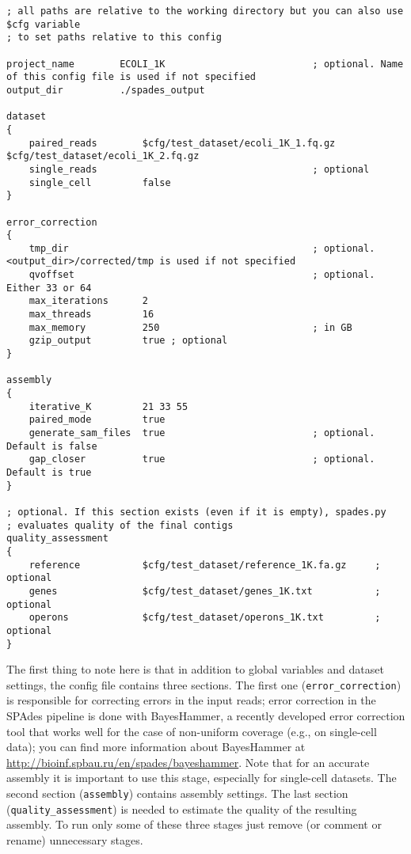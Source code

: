 \documentclass{article}
\def\spades{SPAdes}
\def\bh{BayesHammer}
\begin{document}
\begin{lstlisting}													
; all paths are relative to the working directory but you can also use $cfg variable 
; to set paths relative to this config

project_name        ECOLI_1K                          ; optional. Name of this config file is used if not specified
output_dir          ./spades_output

dataset
{
    paired_reads        $cfg/test_dataset/ecoli_1K_1.fq.gz $cfg/test_dataset/ecoli_1K_2.fq.gz
    single_reads                                      ; optional
    single_cell         false
}

error_correction
{
    tmp_dir                                           ; optional. <output_dir>/corrected/tmp is used if not specified
    qvoffset                                          ; optional. Either 33 or 64
    max_iterations      2
    max_threads         16
    max_memory          250                           ; in GB
    gzip_output         true ; optional
}

assembly
{
    iterative_K         21 33 55
    paired_mode         true
    generate_sam_files  true                          ; optional. Default is false
    gap_closer          true                          ; optional. Default is true
}

; optional. If this section exists (even if it is empty), spades.py 
; evaluates quality of the final contigs
quality_assessment      
{
    reference           $cfg/test_dataset/reference_1K.fa.gz     ; optional
    genes               $cfg/test_dataset/genes_1K.txt           ; optional
    operons             $cfg/test_dataset/operons_1K.txt         ; optional
}
\end{lstlisting}

The first thing to note here is that in addition to global variables and dataset settings,
the config file contains three sections. The first one ({\tt error\_correction}) is responsible for correcting errors in the input reads;
error correction in the {\spades} pipeline is done with {\bh}, a recently developed error correction tool that works well for the case of non-uniform coverage
(e.g., on single-cell data); you can find more information about {\bh} at \url{http://bioinf.spbau.ru/en/spades/bayeshammer}.
Note that for an accurate assembly it is important to use this stage, especially for single-cell datasets.
The second section ({\tt assembly}) contains assembly settings. The last section ({\tt quality\_assessment})
is needed to estimate the quality of the resulting assembly. To run only some of these three stages just remove (or comment or rename) unnecessary stages.
\end{document}
